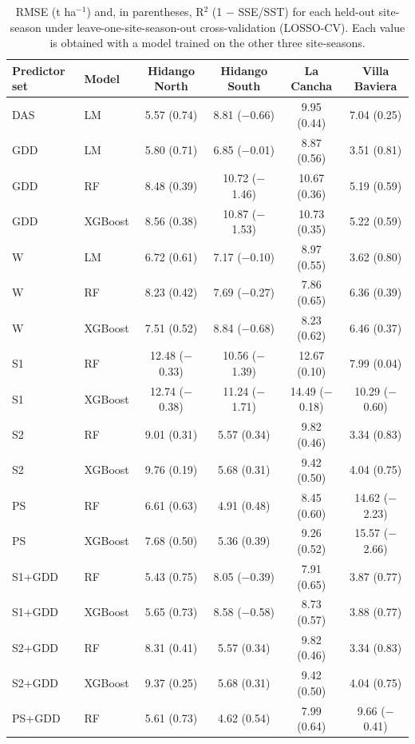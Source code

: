 \begin{table}[htbp]
\centering
\footnotesize
\caption{RMSE (t ha$^{-1}$) and, in parentheses, R$^2$ (1 $-$ SSE/SST) for each held-out site-season under leave-one-site-season-out cross-validation (LOSSO-CV). Each value is obtained with a model trained on the other three site-seasons.}
\label{tbl-s2}
\begin{tabular}{l l c c c c}
\toprule
\textbf{Predictor set} & \textbf{Model} & \textbf{Hidango North} & \textbf{Hidango South} & \textbf{La Cancha} & \textbf{Villa Baviera} \\
\midrule
DAS & LM & 5.57 (0.74) & 8.81 ($-$0.66) & 9.95 (0.44) & 7.04 (0.25) \\
GDD & LM & 5.80 (0.71) & 6.85 ($-$0.01) & 8.87 (0.56) & 3.51 (0.81) \\
GDD & RF & 8.48 (0.39) & 10.72 ($-$1.46) & 10.67 (0.36) & 5.19 (0.59) \\
GDD & XGBoost & 8.56 (0.38) & 10.87 ($-$1.53) & 10.73 (0.35) & 5.22 (0.59) \\
W & LM & 6.72 (0.61) & 7.17 ($-$0.10) & 8.97 (0.55) & 3.62 (0.80) \\
W & RF & 8.23 (0.42) & 7.69 ($-$0.27) & 7.86 (0.65) & 6.36 (0.39) \\
W & XGBoost & 7.51 (0.52) & 8.84 ($-$0.68) & 8.23 (0.62) & 6.46 (0.37) \\
S1 & RF & 12.48 ($-$0.33) & 10.56 ($-$1.39) & 12.67 (0.10) & 7.99 (0.04) \\
S1 & XGBoost & 12.74 ($-$0.38) & 11.24 ($-$1.71) & 14.49 ($-$0.18) & 10.29 ($-$0.60) \\
S2 & RF & 9.01 (0.31) & 5.57 (0.34) & 9.82 (0.46) & 3.34 (0.83) \\
S2 & XGBoost & 9.76 (0.19) & 5.68 (0.31) & 9.42 (0.50) & 4.04 (0.75) \\
PS & RF & 6.61 (0.63) & 4.91 (0.48) & 8.45 (0.60) & 14.62 ($-$2.23) \\
PS & XGBoost & 7.68 (0.50) & 5.36 (0.39) & 9.26 (0.52) & 15.57 ($-$2.66) \\
S1+GDD & RF & 5.43 (0.75) & 8.05 ($-$0.39) & 7.91 (0.65) & 3.87 (0.77) \\
S1+GDD & XGBoost & 5.65 (0.73) & 8.58 ($-$0.58) & 8.73 (0.57) & 3.88 (0.77) \\
S2+GDD & RF & 8.31 (0.41) & 5.57 (0.34) & 9.82 (0.46) & 3.34 (0.83) \\
S2+GDD & XGBoost & 9.37 (0.25) & 5.68 (0.31) & 9.42 (0.50) & 4.04 (0.75) \\
PS+GDD & RF & 5.61 (0.73) & 4.62 (0.54) & 7.99 (0.64) & 9.66 ($-$0.41) \\

\end{tabular}
\end{table}
